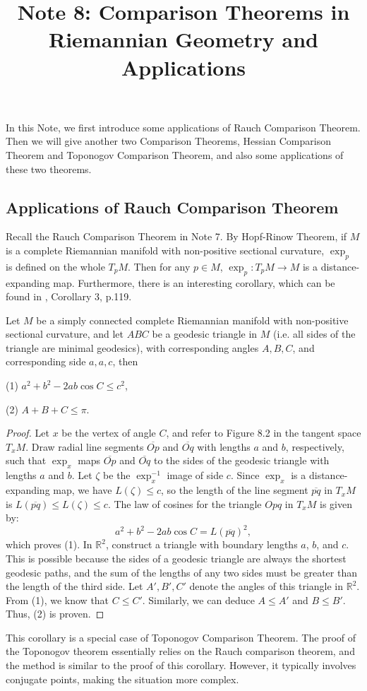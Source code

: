 \documentclass{ctexart}
\title{Note 8: Comparison Theorems in Riemannian Geometry and Applications}
\date{} %
\begin{document}
\maketitle

In this Note, we first introduce some applications of Rauch Comparison Theorem. Then we will give another two Comparison Theorems, Hessian Comparison Theorem and Toponogov Comparison Theorem, 
and also some applications of these two theorems. 


\subsection*{Applications of Rauch Comparison Theorem}

Recall the Rauch Comparison Theorem in Note 7. By Hopf-Rinow Theorem, if $M$ is a complete Riemannian manifold with non-positive sectional curvature, $\exp_p$ is defined on the whole $T_pM$. 
Then for any $p \in M$, $\exp_{p}: T_pM \rightarrow M$ is a distance-expanding map. 
Furthermore, there is an interesting corollary, which can be found in \cite{WuHongXi2014}, Corollary 3, p.119.
\begin{corollary}
    Let $M$ be a simply connected complete Riemannian manifold with non-positive sectional curvature, and let $ABC$ be a geodesic triangle in $M$ 
    (i.e. all sides of the triangle are minimal geodesics), with corresponding angles $A, B, C$, and corresponding side $a, a, c$, then 

    (1) $a^2+b^2-2 a b \cos C \leq c^2$, 

    (2) $A+B+C \leq \pi$. 
\end{corollary}
\begin{proof}[Proof]
    Let $x$ be the vertex of angle $C$, and refer to Figure 8.2 in the tangent space $T_x M$. Draw radial line segments $\overline{O p}$ and $\overline{O q}$ with lengths $a$ and $b$, respectively, 
    such that $\exp_x$ maps $\overline{O p}$ and $\overline{O q}$ to the sides of the geodesic triangle with lengths $a$ and $b$. Let $\zeta$ be the $\exp_x^{-1}$ image of side $c$. 
    Since $\exp_x$ is a distance-expanding map, we have $L(\zeta) \leq c$, so the length of the line segment $\overline{p q}$ in $T_x M$ is $L(\overline{p q}) \leq L(\zeta) \leq c$.
    The law of cosines for the triangle $O p q$ in $T_x M$ is given by:
    $$
    a^2 + b^2 - 2ab\cos C = L(\overline{p q})^2,
    $$
    which proves (1).
    In $\mathbb{R}^2$, construct a triangle with boundary lengths $a$, $b$, and $c$. This is possible because the sides of a geodesic triangle are always the shortest geodesic paths, 
    and the sum of the lengths of any two sides must be greater than the length of the third side. Let $A', B', C'$ denote the angles of this triangle in $\mathbb{R}^2$.
    From (1), we know that $C \leq C'$. Similarly, we can deduce $A \leq A'$ and $B \leq B'$. Thus, (2) is proven.
\end{proof}
This corollary is a special case of Toponogov Comparison Theorem. The proof of the Toponogov theorem essentially relies on the Rauch comparison theorem,
and the method is similar to the proof of this corollary. However, it typically involves conjugate points, making the situation more complex.
\end{document}
